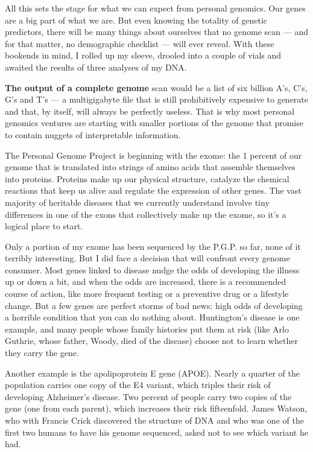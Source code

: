All this sets the stage for what we can expect from personal genomics.
Our genes are a big part of what we are. But even knowing the totality
of genetic predictors, there will be many things about ourselves that no
genome scan --- and for that matter, no demographic checklist --- will
ever reveal. With these bookends in mind, I rolled up my sleeve, drooled
into a couple of vials and awaited the results of three analyses of my
DNA.

\textbf{The output of a complete genome} scan would be a list of six
billion A's, C's, G's and T's --- a multigigabyte file that is still
prohibitively expensive to generate and that, by itself, will always be
perfectly useless. That is why most personal genomics ventures are
starting with smaller portions of the genome that promise to contain
nuggets of interpretable information.

The Personal Genome Project is beginning with the exome: the 1 percent
of our genome that is translated into strings of amino acids that
assemble themselves into proteins. Proteins make up our physical
structure, catalyze the chemical reactions that keep us alive and
regulate the expression of other genes. The vast majority of heritable
diseases that we currently understand involve tiny differences in one of
the exons that collectively make up the exome, so it's a logical place
to start.

Only a portion of my exome has been sequenced by the P.G.P. so far, none
of it terribly interesting. But I did face a decision that will confront
every genome consumer. Most genes linked to disease nudge the odds of
developing the illness up or down a bit, and when the odds are
increased, there is a recommended course of action, like more frequent
testing or a preventive drug or a lifestyle change. But a few genes are
perfect storms of bad news: high odds of developing a horrible condition
that you can do nothing about. Huntington's disease is one example, and
many people whose family histories put them at risk (like Arlo Guthrie,
whose father, Woody, died of the disease) choose not to learn whether
they carry the gene.

Another example is the apolipoprotein E gene (APOE). Nearly a quarter of
the population carries one copy of the E4 variant, which triples their
risk of developing Alzheimer's disease. Two percent of people carry two
copies of the gene (one from each parent), which increases their risk
fifteenfold. James Watson, who with Francis Crick discovered the
structure of DNA and who was one of the first two humans to have his
genome sequenced, asked not to see which variant he had.

